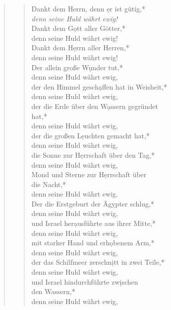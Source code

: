 
\begin{quote}
\begin{verse}

\smallskip

Dankt dem Herrn, denn \d er ist gütig,*\\ 
\textit{denn seine Huld währt ewig!} \\ \vin
Dankt dem G\d ott aller Götter,*\\ \vin 
denn seine Huld währt ewig! \\
Dankt dem H\d errn aller Herren,*\\ 
denn seine Huld währt ewig!\\ \vin
Der allein große W\d under tut,*\\ \vin 
denn seine Huld währt ewig, \\
der den Himmel gesch\d affen hat in Weisheit,*\\ 
denn seine Huld währt ewig, \\ \vin
der die Erde über den W\d assern gegründet\\ \vin hat,*\\ \vin 
denn seine Huld währt ewig, \\
der die großen L\d euchten gemacht hat,*\\ 
denn seine Huld währt ewig, \\ \vin
die Sonne zur H\d errschaft über den Tag,*\\ \vin 
denn seine Huld währt ewig,\\
Mond und Sterne zur H\d errschaft über\\ die Nacht,*\\ 
denn seine Huld währt ewig.\\ \vin 
Der die Erstgeburt der Äg\d ypter schlug,*\\ \vin 
denn seine Huld währt ewig, \\
und Israel her\d ausführte aus ihrer Mitte,*\\ 
denn seine Huld währt ewig, \\ \vin
mit starker Hand und erh\d obenem Arm,*\\ \vin 
denn seine Huld währt ewig,\\
der das Schilfmeer zerschn\d itt in zwei Teile,*\\ 
denn seine Huld währt ewig,\\ \vin
und Israel hindurchführte zw\d ischen \\ \vin den Wassern,*\\ \vin 
denn seine Huld währt ewig,\\

\end{verse}
\end{quote}
